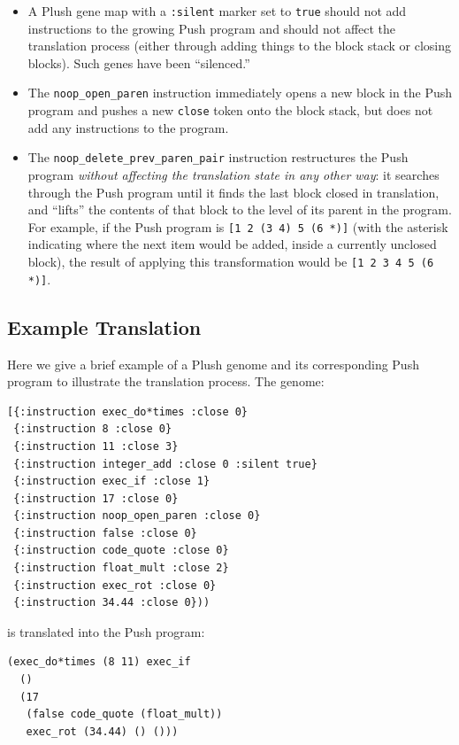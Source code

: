 \documentclass[graybox]{svmult}
\begin{document}
\begin{itemize}
\item
A Plush gene map with a \texttt{:silent} marker set to \texttt{true} should not add instructions to the growing Push program and should not affect the translation process (either through adding things to the block stack or closing blocks). Such genes have been ``silenced.''

\item
The  \texttt{noop\_open\_paren} instruction immediately opens a new block in the Push program and pushes a new \texttt{close} token onto the block stack, but does not add any instructions to the program.

\item
The  \texttt{noop\_delete\_prev\_paren\_pair}  instruction restructures the Push program \textit{without affecting the translation state in any other way}: it searches through the Push program until it finds the last block closed in translation, and ``lifts'' the contents of that block to the level of its parent in the program. For example, if the Push program is \texttt{[1 2 (3 4) 5 (6 *)]} (with the asterisk indicating where the next item would be added, inside a currently unclosed block), the result of applying this transformation would be \texttt{[1 2 3 4 5 (6 *)]}.

\end{itemize}


\subsection{Example Translation}

Here we give a brief example of a Plush genome and its corresponding Push program to illustrate the translation process. The genome:
\begin{verbatim}
[{:instruction exec_do*times :close 0}
 {:instruction 8 :close 0}
 {:instruction 11 :close 3}
 {:instruction integer_add :close 0 :silent true}
 {:instruction exec_if :close 1}
 {:instruction 17 :close 0}
 {:instruction noop_open_paren :close 0}
 {:instruction false :close 0}
 {:instruction code_quote :close 0}
 {:instruction float_mult :close 2}
 {:instruction exec_rot :close 0}
 {:instruction 34.44 :close 0}))
\end{verbatim}
is translated into the Push program:
\begin{verbatim}
(exec_do*times (8 11) exec_if
  ()
  (17
   (false code_quote (float_mult))
   exec_rot (34.44) () ()))
\end{verbatim}
\end{document}
